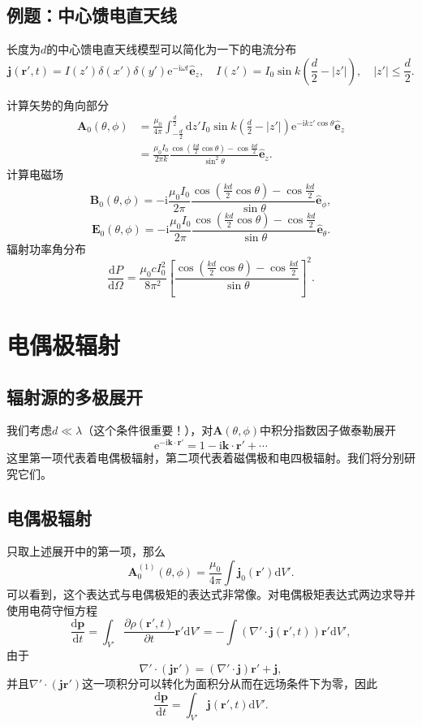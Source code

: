 \documentclass[UTF8]{ctexbook}
\newcommand{\e}{\mathrm{e}}
\renewcommand{\d}{\mathrm{d}}
\renewcommand{\b}{\boldsymbol}
\renewcommand{\i}{\mathrm{i}}
\numberwithin{equation}{chapter}
\begin{document}
	\subsection{例题：中心馈电直天线}
	长度为$d$的中心馈电直天线模型可以简化为一下的电流分布
	\[\b{j}(\b{r}',t)=I(z')\delta(x')\delta(y')\e^{-\i\omega t}\hat{\b{e}}_z,\quad I(z')=I_0\sin k\left(\frac{d}{2}-|z'|\right),\quad |z'|\leq \frac{d}{2}.\]
	
	计算矢势的角向部分
	\begin{align*}
		\b{A}_0(\theta,\phi)&=\frac{\mu_0}{4\pi}\int_{-\frac{d}{2}}^{\frac{d}{2}} \d z' I_0\sin k\left(\frac{d}{2}-|z'|\right)\e^{-\i kz'\cos\theta}\hat{\b{e}}_z \\
		&=\frac{\mu_0I_0}{2\pi k}\frac{\cos\left(\frac{kd}{2}\cos\theta\right)-\cos\frac{kd}{2}}{\sin^2\theta}\hat{\b{e}}_z.
	\end{align*}
	计算电磁场
	\[\b{B}_0(\theta,\phi)=-\i\frac{\mu_0I_0}{2\pi}\frac{\cos\left(\frac{kd}{2}\cos\theta\right)-\cos\frac{kd}{2}}{\sin\theta}\hat{\b{e}}_\phi,\]
	\[\b{E}_0(\theta,\phi)=-\i\frac{\mu_0I_0}{2\pi}\frac{\cos\left(\frac{kd}{2}\cos\theta\right)-\cos\frac{kd}{2}}{\sin\theta}\hat{\b{e}}_\theta.\]
	辐射功率角分布
	\[\frac{\d P}{\d \Omega}=\frac{\mu_0cI_0^2}{8\pi^2}\left[\frac{\cos\left(\frac{kd}{2}\cos\theta\right)-\cos\frac{kd}{2}}{\sin\theta}\right]^2.\]
	
	\section{电偶极辐射}
	
	\subsection{辐射源的多极展开}
	我们考虑$d\ll \lambda$（这个条件很重要！），对$\b{A}(\theta,\phi)$中积分指数因子做泰勒展开
	\[\e^{-\i\b{k}\cdot\b{r}'}=1-\i\b{k}\cdot\b{r}'+\cdots\]
	这里第一项代表着电偶极辐射，第二项代表着磁偶极和电四极辐射。我们将分别研究它们。
	
	\subsection{电偶极辐射}
	只取上述展开中的第一项，那么
	\[\b{A}_0^{(1)}(\theta,\phi)=\frac{\mu_0}{4\pi}\int\b{j}_0(\b{r}')\d V'.\]
	可以看到，这个表达式与电偶极矩的表达式非常像。对电偶极矩表达式两边求导并使用电荷守恒方程
	\[\frac{\d \b{p}}{\d t}=\int_{V'}\frac{\partial \rho(\b{r}',t)}{\partial t}\b{r}'\d V'=-\int(\nabla'\cdot\b{j}(\b{r}',t))\b{r}'\d V',\]
	由于
	\[\nabla'\cdot(\b{j}\b{r}')=(\nabla'\cdot\b{j})\b{r}'+\b{j},\]
	并且$\nabla'\cdot(\b{j}\b{r}')$这一项积分可以转化为面积分从而在远场条件下为零，因此
	\[\frac{\d \b{p}}{\d t}=\int_{V'}\b{j}(\b{r}',t)\d V'.\]
	
\end{document}
